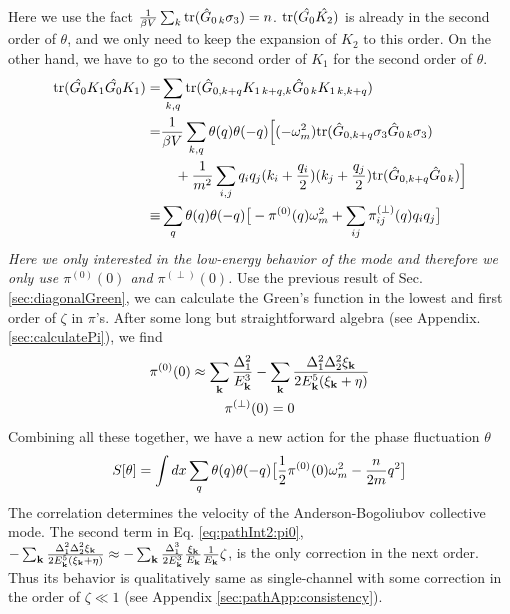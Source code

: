 Here we use the fact $\frac{1}{{\beta{}V}}\sum_{k}\text{tr}(\hat{G}_{0\,k}\sigma_3)=n$. $\text{tr}(\hat{G_{0}}\hat{K_2})$ is already in the second order of $\theta$, and we only need to keep the expansion of $K_2$ to this order. On the other hand, we have to go to the second order of $K_1$ for the second order of $\theta$. 
\begin{align}		
\text{tr}(\hat{G_{0}}{K_1}\hat{G_{0}}{K_1})=&\sum_{k,q}\text{tr}(\hat{G}_{0,k+q}K_{1\,k+q,k}\hat{G}_{0\,k}K_{1\,k,k+q})\\
=&\frac{1}{{\beta{}V}}\sum_{k,q}\theta(q)\theta(-q)\Big[(-\omega_m^2)\text{tr}(\hat{G}_{0,k+q}\sigma_3\hat{G}_{0\,k}\sigma_3)\nonumber\\
&\quad+\frac{1}{m^2}\sum_{i,j}q_iq_j(k_i+\frac{q_i}{2})(k_j+\frac{q_j}{2})\text{tr}(\hat{G}_{0,k+q}\hat{G}_{0\,k})\Big]\nonumber\\
\equiv&\sum_{q}\theta(q)\theta(-q)\big[-\pi^{(0)}(q)\omega_m^2+\sum_{ij}\pi^{(\perp)}_{ij}(q)q_iq_j\big]
\end{align}
\emph{Here we only interested in the low-energy behavior of the mode and therefore we only use $\pi^{(0)}(0)$ and $\pi^{(\perp)}(0)$.} Use the previous result of Sec. \ref{sec:diagonalGreen}, we can calculate the Green's function in the lowest and first order of $\zeta$ in $\pi$'s.  After some long but straightforward algebra (see Appendix. \ref{sec:calculatePi}), we find
\begin{gather}
\pi^{(0)}(0)\approx\sum_{\mathbf{k}}\frac{\Delta_{1}^{2}}{E_{\mathbf{k}}^{3}}
	-\sum_{\mathbf{k}}\frac{\Delta_{1}^{2}\Delta_{2}^{2}\xi_{\mathbf{k}}}{2E_{\mathbf{k}}^{5}(\xi_{\mathbf{k}}+\eta)}
\label{eq:pathInt2:pi0}\\
\pi^{(\perp)}(0)=0
\end{gather}
Combining all these together, we have a new action for the phase fluctuation $\theta$
\begin{equation}
S[\theta]=\int{dx}\sum_{q}\theta(q)\theta(-q)\big[\frac{1}{2}\pi^{(0)}(0)\omega_m^2-\frac{n}{2m}q^2\big]
\end{equation}
The correlation determines the velocity of the Anderson-Bogoliubov collective mode.  The second term in Eq. \eqref{eq:pathInt2:pi0}, $-\sum_{\mathbf{k}}\frac{\Delta_{1}^{2}\Delta_{2}^{2}\xi_{\mathbf{k}}}{2E_{\mathbf{k}}^{5}(\xi_{\mathbf{k}}+\eta)}\approx-\sum_{\mathbf{k}}\frac{\Delta_{1}^{3}}{2E_{\mathbf{k}}^{3}}\frac{\xi_{\mathbf{k}}}{E_{\mathbf{k}}}\frac{1}{E_{\mathbf{k}}}\zeta$, is the only correction in the next order.  Thus its behavior is qualitatively same as  single-channel with some correction in the order of $\zeta\ll1$ (see Appendix \ref{sec:pathApp:consistency}).


